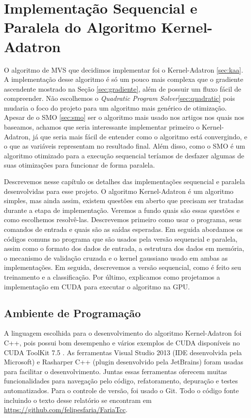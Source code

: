 \chapter{Implementação Sequencial e Paralela do Algoritmo Kernel-Adatron}\label{chp:LABEL_CHP_4} %

O algoritmo de MVS que decidimos implementar foi o Kernel-Adatron \ref{sec:kaa}. A implementação desse algoritmo é só um pouco mais complexa que o gradiente ascendente mostrado na Seção \ref{sec:gradiente}, além de possuir um fluxo fácil de compreender. Não escolhemos o \emph{Quadratic Program Solver}\ref{sec:quadratic} pois mudaria o foco do projeto para um algoritmo mais genérico de otimização. Apesar de o SMO \ref{sec:smo} ser o algoritmo mais usado nos artigos nos quais nos baseamos, achamos que seria interessante implementar primeiro o Kernel-Adatron, já que seria mais fácil de entender como o algoritmo está convergindo, e o que as variáveis representam no resultado final. Além disso, como o SMO é um algoritmo otimizado para a execução sequencial teríamos de desfazer algumas de suas otimizações para funcionar de forma paralela.

Descrevemos nesse capítulo os detalhes das implementações sequencial e paralela desenvolvidas para esse projeto. O algoritmo Kernel-Adatron é um algoritmo simples, mas ainda assim, existem 
questões em aberto que precisam ser tratadas durante a etapa de implementação. Veremos a fundo quais são essas questões e como escolhemos resolvê-las. Descrevemos primeiro como usar o programa, seus comandos de entrada e quais são as saídas esperadas. Em seguida abordamos os códigos comuns no programa que são usados pela versão sequencial e paralela, assim como o formato dos dados de entrada, a estrutura dos dados em memória, o mecanismo de validação cruzada e o kernel gaussiano usado em ambas as implementações.
Em seguida, descrevemos a versão sequencial, como é feito seu treinamento e a classificação. Por último, explicamos como projetamos a implementação em CUDA para executar o algoritmo na GPU.

\section{Ambiente de Programação}
A linguagem escolhida para o desenvolvimento do algoritmo Kernel-Adatron foi C++, pois possui bom desempenho e vários exemplos de CUDA disponíveis no CUDA ToolKit 7.5 \cite{CUDA}. As ferramentas Visual Studio 2013 (IDE desenvolvida pela Microsoft) e Rasharper C++ (plugin desenvolvido pela JetBrains) foram usadas para facilitar o desenvolvimento. Juntas essas ferramentas oferecem muitas funcionalidades para navegação pelo código, refatoramento, depuração e testes automatizados. Para o controle de versão, foi usado o Git. Todo o código fonte incluindo o texto desse relatório se encontram em \url{https://github.com/felipesfaria/FariaTcc}.

